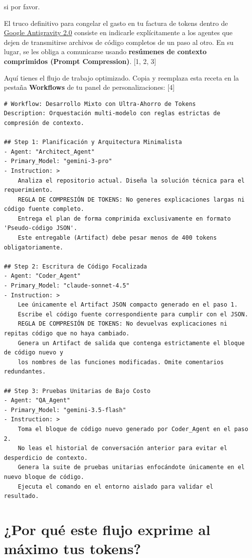 \documentclass[12pt, a4paper]{article}
\begin{document}
si por favor.

El truco definitivo para congelar el gasto en tu factura de tokens dentro de \href{https://antigravity.google/}{Google Antigravity 2.0} consiste en indicarle explícitamente a los agentes que dejen de transmitirse archivos de código completos de un paso al otro. En su lugar, se les obliga a comunicarse usando \textbf{resúmenes de contexto comprimidos (Prompt Compression)}. [1, 2, 3]

Aquí tienes el flujo de trabajo optimizado. Copia y reemplaza esta receta en la pestaña \textbf{Workflows} de tu panel de personalizaciones: [4]

\begin{verbatim}
# Workflow: Desarrollo Mixto con Ultra-Ahorro de Tokens
Description: Orquestación multi-modelo con reglas estrictas de compresión de contexto.

## Step 1: Planificación y Arquitectura Minimalista
- Agent: "Architect_Agent"
- Primary_Model: "gemini-3-pro"
- Instruction: >
    Analiza el repositorio actual. Diseña la solución técnica para el requerimiento.
    REGLA DE COMPRESIÓN DE TOKENS: No generes explicaciones largas ni código fuente completo.
    Entrega el plan de forma comprimida exclusivamente en formato 'Pseudo-código JSON'.
    Este entregable (Artifact) debe pesar menos de 400 tokens obligatoriamente.

## Step 2: Escritura de Código Focalizada
- Agent: "Coder_Agent"
- Primary_Model: "claude-sonnet-4.5"
- Instruction: >
    Lee únicamente el Artifact JSON compacto generado en el paso 1.
    Escribe el código fuente correspondiente para cumplir con el JSON.
    REGLA DE COMPRESIÓN DE TOKENS: No devuelvas explicaciones ni repitas código que no haya cambiado.
    Genera un Artifact de salida que contenga estrictamente el bloque de código nuevo y
    los nombres de las funciones modificadas. Omite comentarios redundantes.

## Step 3: Pruebas Unitarias de Bajo Costo
- Agent: "QA_Agent"
- Primary_Model: "gemini-3.5-flash"
- Instruction: >
    Toma el bloque de código nuevo generado por Coder_Agent en el paso 2.
    No leas el historial de conversación anterior para evitar el desperdicio de contexto.
    Genera la suite de pruebas unitarias enfocándote únicamente en el nuevo bloque de código.
    Ejecuta el comando en el entorno aislado para validar el resultado.
\end{verbatim}

\section*{¿Por qué este flujo exprime al máximo tus tokens?}
\end{document}
